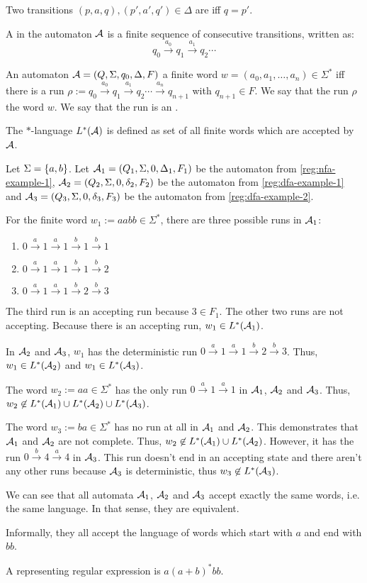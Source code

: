 Two transitions $(p,a,q), (p',a',q') \in \Delta$ are  iff $q=p'$.

A  in the automaton $\mathcal{A}$ is a finite sequence of consecutive transitions, written as:
\[ q_0 \xrightarrow{a_0} q_1 \xrightarrow{a_1} q_2 \cdots \]

An automaton $\mathcal{A} = (Q, \Sigma, q_0, \Delta, F)$  a finite word $w = (a_0,a_1,\dots,a_n) \in \Sigma^*$ iff there is a run $\rho := q_0 \xrightarrow{a_0} q_1 \xrightarrow{a_1} q_2 \cdots \xrightarrow{a_n} q_{n+1}$ with $q_{n+1} \in F$. We say that the run $\rho$  the word $w$. We say that the run is an .

The $*$-language $L^*(\mathcal{A})$ is defined as set of all finite words which are accepted by $\mathcal{A}$.

\begin{simpleexample}
Let $\Sigma = \Set{a,b}$. Let $\mathcal{A}_1 = (Q_1,\Sigma,0,\Delta_1,F_1)$ be the automaton from \cref{reg:nfa-example-1}, $\mathcal{A}_2 = (Q_2,\Sigma,0,\delta_2,F_2)$ be the automaton from \cref{reg:dfa-example-1} and $\mathcal{A}_3 = (Q_3,\Sigma,0,\delta_3,F_3)$ be the automaton from \cref{reg:dfa-example-2}.

For the finite word $w_1 := aabb \in \Sigma^*$, there are three possible runs in $\mathcal{A}_1$:
\begin{enumerate}
\item $0 \xrightarrow{a} 1 \xrightarrow{a} 1 \xrightarrow{b} 1 \xrightarrow{b} 1$
\item $0 \xrightarrow{a} 1 \xrightarrow{a} 1 \xrightarrow{b} 1 \xrightarrow{b} 2$
\item $0 \xrightarrow{a} 1 \xrightarrow{a} 1 \xrightarrow{b} 2 \xrightarrow{b} 3$
\end{enumerate}
The third run is an accepting run because $3 \in F_1$. The other two runs are not accepting. Because there is an accepting run, $w_1 \in L^*(\mathcal{A}_1)$.

In $\mathcal{A}_2$ and $\mathcal{A}_3$, $w_1$ has the deterministic run $0 \xrightarrow{a} 1 \xrightarrow{a} 1 \xrightarrow{b} 2 \xrightarrow{b} 3$. Thus, $w_1 \in L^*(\mathcal{A}_2)$ and $w_1 \in L^*(\mathcal{A}_3)$.

The word $w_2 := aa \in \Sigma^*$ has the only run $0 \xrightarrow{a} 1 \xrightarrow{a} 1$ in $\mathcal{A}_1$, $\mathcal{A}_2$ and $\mathcal{A}_3$. Thus, $w_2 \not\in L^*(\mathcal{A}_1) \cup L^*(\mathcal{A}_2) \cup L^*(\mathcal{A}_3)$.

The word $w_3 := ba \in \Sigma^*$ has no run at all in $\mathcal{A}_1$ and $\mathcal{A}_2$. This demonstrates that $\mathcal{A}_1$ and $\mathcal{A}_2$ are not complete. Thus, $w_2 \not\in L^*(\mathcal{A}_1) \cup L^*(\mathcal{A}_2)$. However, it has the run $0 \xrightarrow{b} 4 \xrightarrow{a} 4$ in $\mathcal{A}_3$. This run doesn't end in an accepting state and there aren't any other runs because $\mathcal{A}_3$ is deterministic, thus $w_3 \not\in L^*(\mathcal{A}_3)$.

We can see that all automata $\mathcal{A}_1$, $\mathcal{A}_2$ and $\mathcal{A}_3$ accept exactly the same words, i.e. the same language. In that sense, they are equivalent.

Informally, they all accept the language of words which start with $a$ and end with $bb$.

A representing regular expression is $a(a+b)^*bb$.
\end{simpleexample}

